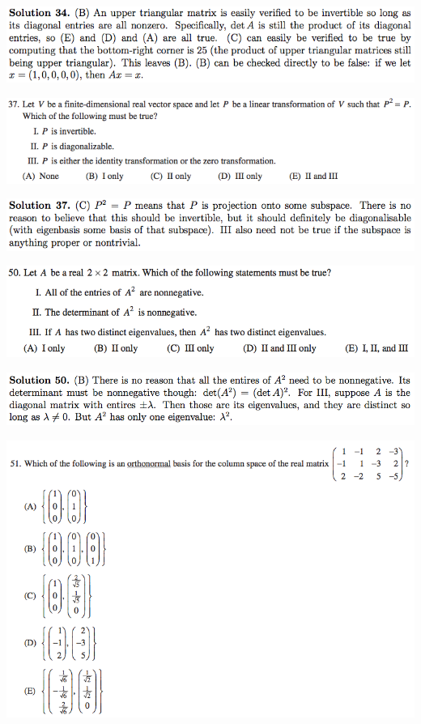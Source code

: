 \documentclass{article}
\begin{document}
\includegraphics[scale=0.65]{1268_34s}

\includegraphics[scale=0.65]{1268_37}

\includegraphics[scale=0.65]{1268_37s}

\includegraphics[scale=0.5]{0568_50}

\includegraphics[scale=0.5]{0568_50s}

\includegraphics[scale=0.65]{1268_51}
\end{document}
